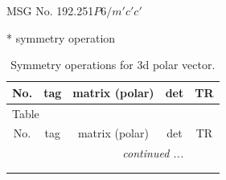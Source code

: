 \documentclass[fleqn,8pt]{jsarticle}
\begin{document}
\setcounter{MaxMatrixCols}{32}

\renewcommand{\tablename}{Table~}
\renewcommand{\figurename}{Figure~}
\begin{center}
\LARGE
MSG No. 192.251\quad$P6/m'c'c'$
\end{center}
* symmetry operation
\renewcommand{\arraystretch}{1.3}
\begin{longtable}{ccccc}
\caption{Symmetry operations for 3d polar vector.}
 \\
 \hline \hline
No. & tag & matrix (polar) & det & TR \\ \hline \endfirsthead

\multicolumn{4}{l}{\tablename\ \thetable{}} \\
 \hline \hline
No. & tag & matrix (polar) & det & TR \\ \hline \endhead

 \hline \hline
\multicolumn{4}{r}{\footnotesize\it continued ...} \\ \endfoot

 \hline \hline
\multicolumn{4}{r}{} \\ \endlastfoot


\end{longtable}
\end{document}
